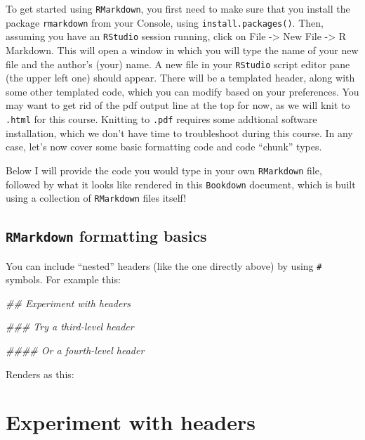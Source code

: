 \documentclass[]{book}
\newenvironment{Shaded}{\begin{snugshade}}{\end{snugshade}}
\newcommand{\CommentTok}[1]{\textcolor[rgb]{0.56,0.35,0.01}{\textit{#1}}}
\begin{document}
To get started using \texttt{RMarkdown}, you first need to make sure that you install the package \texttt{rmarkdown} from your Console, using \texttt{install.packages()}. Then, assuming you have an \texttt{RStudio} session running, click on File -\textgreater{} New File -\textgreater{} R Markdown. This will open a window in which you will type the name of your new file and the author's (your) name. A new file in your \texttt{RStudio} script editor pane (the upper left one) should appear. There will be a templated header, along with some other templated code, which you can modify based on your preferences. You may want to get rid of the pdf output line at the top for now, as we will knit to \texttt{.html} for this course. Knitting to \texttt{.pdf} requires some addtional software installation, which we don't have time to troubleshoot during this course. In any case, let's now cover some basic formatting code and code ``chunk'' types.

Below I will provide the code you would type in your own \texttt{RMarkdown} file, followed by what it looks like rendered in this \texttt{Bookdown} document, which is built using a collection of \texttt{RMarkdown} files itself!

\hypertarget{rmarkdown-formatting-basics}{%
\subsection{\texorpdfstring{\texttt{RMarkdown} formatting basics}{RMarkdown formatting basics}}\label{rmarkdown-formatting-basics}}

You can include ``nested'' headers (like the one directly above) by using \texttt{\#} symbols. For example this:

\begin{Shaded}
\begin{Highlighting}[]
\CommentTok{## Experiment with headers}

\CommentTok{### Try a third-level header}

\CommentTok{#### Or a fourth-level header}
\end{Highlighting}
\end{Shaded}

Renders as this:

\hypertarget{experiment-with-headers}{%
\section{Experiment with headers}\label{experiment-with-headers}}
\end{document}
